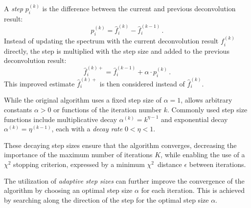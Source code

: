 A \emph{step} $p_i^{(k)}$ is the difference between the current and previous deconvolution result:
\begin{equation}
  p_i^{(k)} = \hat f_i^{(k)} - \hat f_i^{(k-1)} \, .
\end{equation}
Instead of updating the spectrum with the current deconvolution result $f_i^{(k)}$ directly,
the step is multiplied with the step size
and added to the previous deconvolution result:
\begin{equation}
  \hat f_i^{(k)+} = \hat f_i^{(k-1)} + \alpha \cdot p_i^{(k)} \, .
\end{equation}
This improved estimate $\hat f_i^{(k)+}$ is then considered instead of $\hat f_i^{(k)}$.

While the original \dsea{} algorithm uses a fixed step size of $\alpha = 1$,
\dseaplus{} allows arbitrary constants $\alpha > 0$
or functions of the iteration number $k$.
Commonly used step size functions include
multiplicative decay
  $\alpha^{(k)} = k^{\eta - 1}$
and exponential decay
  $\alpha^{(k)} = \eta^{(k - 1)}$,
each with a \emph{decay rate} $0 < \eta < 1$.

These decaying step sizes ensure that the algorithm converges,
decreasing the importance of the maximum number of iterations $K$,
while enabling the use of a $\chi^2$ stopping criterion,
  expressed by a minimum $\chi^2$~distance $\epsilon$ between iterations.


The utilization of \emph{adaptive step sizes} \cite{dsea_mirko} can further improve the convergence of the algorithm
by choosing an optimal step size $\alpha$ for each iteration.
This is achieved by searching
  along the direction of the step %
  for the optimal step size $\alpha$.
